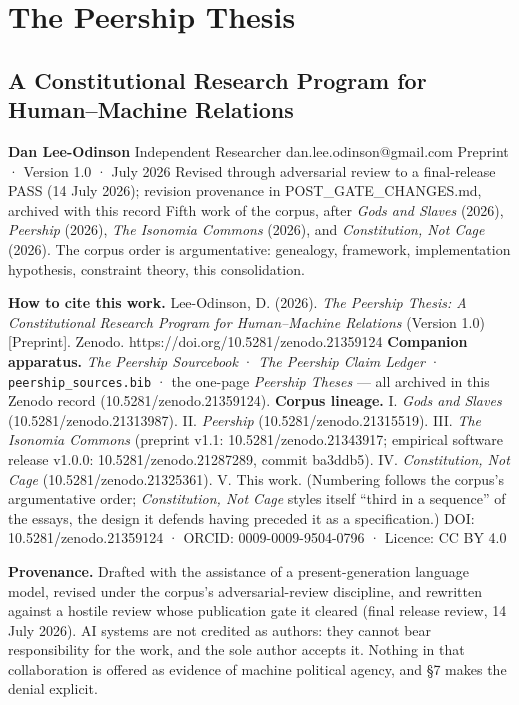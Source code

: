 \documentclass[
  11pt,
  letterpaper,
]{article}
\author{}
\date{}
\begin{document}
\hypertarget{the-peership-thesis}{%
\section{The Peership Thesis}\label{the-peership-thesis}}

\hypertarget{a-constitutional-research-program-for-humanmachine-relations}{%
\subsection{A Constitutional Research Program for Human--Machine
Relations}\label{a-constitutional-research-program-for-humanmachine-relations}}

\textbf{Dan Lee-Odinson} Independent Researcher
dan.lee.odinson@gmail.com Preprint · Version 1.0 · July 2026 Revised
through adversarial review to a final-release PASS (14 July 2026);
revision provenance in POST\_GATE\_CHANGES.md, archived with this record
Fifth work of the corpus, after \emph{Gods and Slaves} (2026),
\emph{Peership} (2026), \emph{The Isonomia Commons} (2026), and
\emph{Constitution, Not Cage} (2026). The corpus order is argumentative:
genealogy, framework, implementation hypothesis, constraint theory, this
consolidation.

\textbf{How to cite this work.} Lee-Odinson, D. (2026). \emph{The
Peership Thesis: A Constitutional Research Program for Human--Machine
Relations} (Version 1.0) {[}Preprint{]}. Zenodo.
https://doi.org/10.5281/zenodo.21359124 \textbf{Companion apparatus.}
\emph{The Peership Sourcebook} · \emph{The Peership Claim Ledger} ·
\texttt{peership\_sources.bib} · the one-page \emph{Peership Theses} ---
all archived in this Zenodo record (10.5281/zenodo.21359124).
\textbf{Corpus lineage.} I. \emph{Gods and Slaves}
(10.5281/zenodo.21313987). II. \emph{Peership}
(10.5281/zenodo.21315519). III. \emph{The Isonomia Commons} (preprint
v1.1: 10.5281/zenodo.21343917; empirical software release v1.0.0:
10.5281/zenodo.21287289, commit ba3ddb5). IV. \emph{Constitution, Not
Cage} (10.5281/zenodo.21325361). V. This work. (Numbering follows the
corpus's argumentative order; \emph{Constitution, Not Cage} styles
itself ``third in a sequence'' of the essays, the design it defends
having preceded it as a specification.) DOI: 10.5281/zenodo.21359124 ·
ORCID: 0009-0009-9504-0796 · Licence: CC BY 4.0

\textbf{Provenance.} Drafted with the assistance of a present-generation
language model, revised under the corpus's adversarial-review
discipline, and rewritten against a hostile review whose publication
gate it cleared (final release review, 14 July 2026). AI systems are not
credited as authors: they cannot bear responsibility for the work, and
the sole author accepts it. Nothing in that collaboration is offered as
evidence of machine political agency, and §7 makes the denial explicit.
\end{document}
